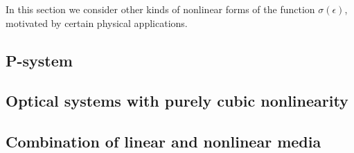In this section we consider other kinds of nonlinear forms of the function
$\sigma(\epsilon)$, motivated by certain physical applications.

\subsection{P-system}

\subsection{Optical systems with purely cubic nonlinearity}

\subsection{Combination of linear and nonlinear media}
